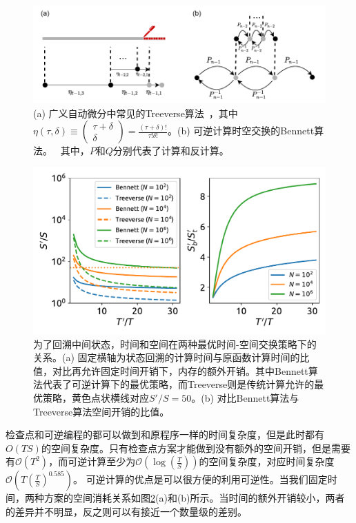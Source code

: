 \documentclass[A4,twoside,fontset=ubuntu,UTF8]{ctexart}
\newcommand{\bigO}{{\mathcal{O}}}
\begin{document}
\begin{figure}
    \centerline{\includegraphics[width=0.88\columnwidth,trim={0 0cm 0 0cm},clip]{tradeoff2.pdf}}
    \caption{(a) 广义自动微分中常见的Treeverse算法~\cite{Griewank1992}，其中$\eta(\tau, \delta) \equiv \left(\begin{matrix} \tau + \delta \\ \delta \end{matrix}\right)=\frac{(\tau+\delta)!}{\tau!\delta!}$。(b) 可逆计算时空交换的Bennett算法。~\cite{Bennett1973,Levine1990} 其中，$P$和$Q$分别代表了计算和反计算。}\label{fig:tradeoff}
\end{figure}

\begin{figure}[h]
\centering
\includegraphics[width=0.8\columnwidth]{./fig1.pdf}
    \caption{为了回溯中间状态，时间和空间在两种最优时间-空间交换策略下的关系。(a) 固定横轴为状态回溯的计算时间与原函数计算时间的比值，对比再允许固定时间开销下，内存的额外开销。其中Bennett算法代表了可逆计算下的最优策略，而Treeverse则是传统计算允许的最优策略，黄色点状横线对应$S'/S=50$。(b) 对比Bennett算法与Treeverse算法空间开销的比值。\label{fig:timespace}} 
\end{figure}

检查点和可逆编程的都可以做到和原程序一样的时间复杂度，但是此时都有$O(TS)$的空间复杂度。只有检查点方案才能做到没有额外的空间开销，但是需要有$\bigO(T^2)$，而可逆计算至少为$\bigO(\log(\frac{T}{S}))$的空间复杂度，对应时间复杂度$\bigO(T(\frac{T}{S})^{0.585})$。
可逆计算的优点是可以很方便的利用可逆性。当我们固定时间，两种方案的空间消耗关系如图\ref{fig:timespace}(a)和(b)所示。当时间的额外开销较小，两者的差异并不明显，反之则可以有接近一个数量级的差别。
\end{document}
